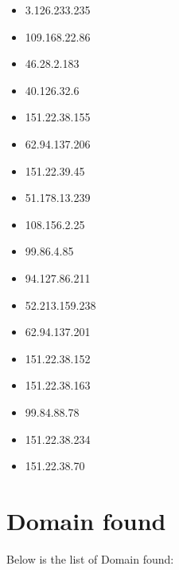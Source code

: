 \documentclass{article}
\begin{document}
\begin{itemize}
        \item 3.126.233.235
    
        \item 109.168.22.86
    
        \item 46.28.2.183
    
        \item 40.126.32.6
    
        \item 151.22.38.155
    
        \item 62.94.137.206
    
        \item 151.22.39.45
    
        \item 51.178.13.239
    
        \item 108.156.2.25
    
        \item 99.86.4.85
    
        \item 94.127.86.211
    
        \item 52.213.159.238
    
        \item 62.94.137.201
    
        \item 151.22.38.152
    
        \item 151.22.38.163
    
        \item 99.84.88.78
    
        \item 151.22.38.234
    
        \item 151.22.38.70
    
\end{itemize}


\section*{Domain found}

Below is the list of Domain found:
\end{document}
